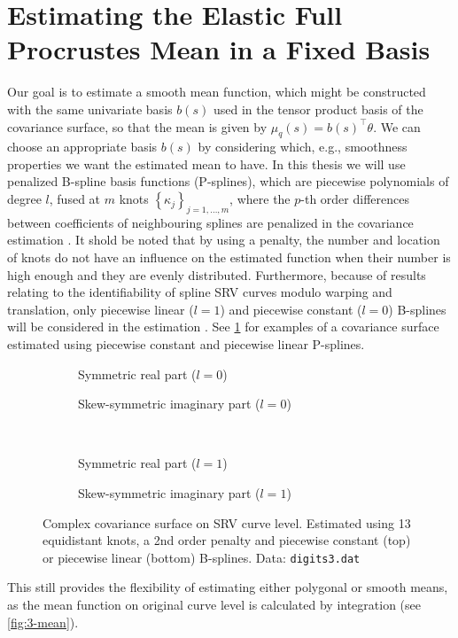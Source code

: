\section{Estimating the Elastic Full Procrustes Mean in a Fixed Basis}
\label{sec:3-mean}
Our goal is to estimate a smooth mean function, which might be constructed with the same univariate basis $b(s)$ used in the tensor product basis of the covariance surface, so that the mean is given by $\mu_q(s) = b(s)^\top \theta$.
We can choose an appropriate basis $b(s)$ by considering which, e.g., smoothness properties we want the estimated mean to have.
In this thesis we will use penalized B-spline basis functions (P-splines), which are piecewise polynomials of degree $l$, fused at $m$ knots $\left\{\kappa_j\right\}_{j=1,\dots,m}$, where the $p$-th order differences between coefficients of neighbouring splines are penalized in the covariance estimation \parencite[see][Chap.~8.1]{FahrmeierEtAl2013}.
It shold be noted that by using a penalty, the number and location of knots do not have an influence on the estimated function when their number is high enough and they are evenly distributed.
Furthermore, because of results relating to the identifiability of spline SRV curves modulo warping and translation, only piecewise linear ($l = 1$) and piecewise constant ($l = 0$) B-splines will be considered in the estimation \parencite[see][]{Steyer2021}.
See \cref{fig:3-cov} for examples of a covariance surface estimated using piecewise constant and piecewise linear P-splines.
\begin{figure}[t]
  \centering
  \begin{subfigure}{.48\textwidth}
    \centering
    \caption{Symmetric real part ($l = 0$)}
  \end{subfigure}\hfill%
  \begin{subfigure}{.48\textwidth}
    \centering
    \caption{Skew-symmetric imaginary part ($l = 0$)}
  \end{subfigure}\vspace{0.66em}\\
  \begin{subfigure}{.48\textwidth}
    \centering
    \caption{Symmetric real part ($l = 1$)}
  \end{subfigure}\hfill%
  \begin{subfigure}{.48\textwidth}
    \centering
    \caption{Skew-symmetric imaginary part ($l =1$)}
  \end{subfigure}
  \caption{Complex covariance surface on SRV curve level. Estimated using 13 equidistant knots, a 2nd order penalty and piecewise constant (top) or piecewise linear (bottom) B-splines. Data: \texttt{digits3.dat}}
  \label{fig:3-cov}
\end{figure}
This still provides the flexibility of estimating either polygonal or smooth means, as the mean function on original curve level is calculated by integration (see \cref{fig:3-mean}). 

